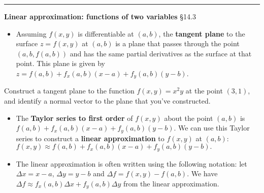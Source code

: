 \documentclass[12pt,letterpaper,noanswers]{exam}
\begin{document}
\vspace{0.2cm}
\hrule
\vspace{0.2cm}

\noindent\textbf{Linear approximation: functions of two variables} \S 14.3
\begin{tcolorbox}
\begin{itemize}
\itemsep0em
    \item Assuming $f(x,y)$ is differentiable at $(a,b)$, the \textbf{tangent plane} to the surface $z=f(x,y)$ at $(a,b)$ is a plane that passes through the point $(a,b,f(a,b))$ and has the same partial derivatives as the surface at that point.  This plane is given by $z = f(a,b) + f_x(a,b)(x-a) + f_y(a,b)(y-b)$.
    \end{itemize}

    \end{tcolorbox}

Construct a tangent plane to the function $f(x,y) = x^2y$ at the point $(3,1)$, and identify a normal vector to the plane that you've constructed.
\vspace{1in}  
    
    \begin{tcolorbox}

     \begin{itemize}
      \itemsep0em
  
    \item The \textbf{Taylor series to first order} of $f(x,y)$ about the point $(a,b)$ is $f(a,b) + f_x(a,b)(x-a) + f_y(a,b)(y-b).$  We can use this Taylor series to construct a \textbf{linear approximation} to $f(x,y)$ at $(a,b)$: $f(x,y) \approx f(a,b) + f_x(a,b)(x-a)+f_y(a,b)(y-b).$ 
    \item The linear approximation is often written using the following notation: let $\Delta x = x - a$, $\Delta y = y - b$ and $\Delta f = f(x,y) - f(a,b)$.  We have $\Delta f \approx f_x(a,b) \Delta x + f_y(a,b)\Delta y$ from the linear approximation.
\end{itemize}
\end{tcolorbox}
\end{document}
